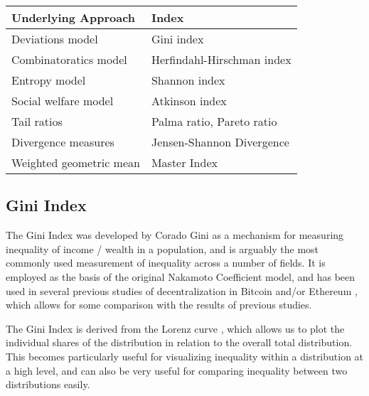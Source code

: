 \documentclass[conference]{IEEEtran}
\begin{document}
\vspace{6pt}

\begin{center}
\begin{tabular}{|l|l|}
\hline
\textbf{Underlying Approach} & \textbf{Index} \\ \hline
Deviations model & Gini index \\ \hline
Combinatoratics model & Herfindahl-Hirschman index \\ \hline
Entropy model & Shannon index \\ \hline
Social welfare model & Atkinson index \\ \hline
Tail ratios & Palma ratio, Pareto ratio \\ \hline
Divergence measures & Jensen-Shannon Divergence \\ \hline
Weighted geometric mean & Master Index \\ \hline
\end{tabular}
\end{center}

\vspace{2pt}

\subsection{Gini Index}

The Gini Index was developed by Corado Gini \cite{gini1936measure} as a mechanism for measuring inequality of income / wealth in a population, and is arguably the most commonly used measurement of inequality across a number of fields.   It is employed as the basis of the original Nakamoto Coefficient model, and has been used in several previous studies of decentralization in Bitcoin and/or Ethereum  \cite{sai2021characterizing, lee2021dq, gupta2018gini, kusmierz2022centralized, kwon2019impossibility, cong2023inclusion, gochhayat2020measuring, karakostas2022sok, zhang2022sok, campajola2022evolution}, which allows for some comparison with the results of previous studies.

The Gini Index is derived from the Lorenz curve \cite{lorenz1905methods}, which allows us to plot the individual shares of the distribution in relation to the overall total distribution. This becomes particularly useful for visualizing inequality within a distribution at a high level, and can also be very useful for comparing inequality between two distributions easily.
\end{document}
